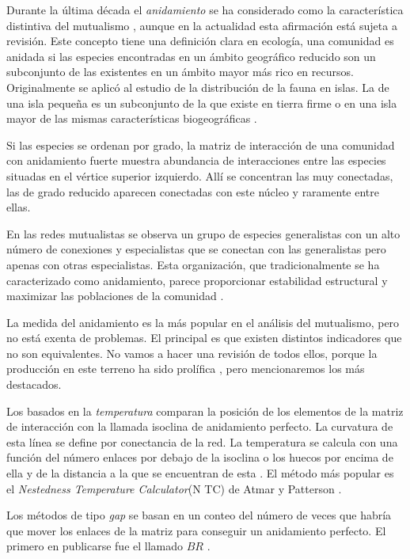 Durante la última década el \textit{anidamiento} se ha considerado como la característica distintiva del mutualismo \cite{bascompte2003nested}, aunque en la actualidad esta afirmación está sujeta a revisión. Este concepto tiene una definición clara en ecología, una comunidad es anidada si las especies encontradas en un ámbito geográfico reducido son un subconjunto de las existentes en un ámbito mayor más rico en recursos. Originalmente se aplicó al estudio de la distribución de la fauna en islas. La de una isla pequeña es un subconjunto de la que existe en tierra firme o en una isla mayor de las mismas características biogeográficas \cite{young1958zoogeography, atmar1986nested}.

Si las especies se ordenan por grado, la matriz de interacción de una comunidad con anidamiento fuerte muestra abundancia de interacciones entre las especies situadas en el vértice superior izquierdo. Allí se concentran las muy conectadas,
las de grado reducido aparecen conectadas con este núcleo y raramente entre ellas.

En las redes mutualistas se observa un grupo de especies generalistas con un alto número de conexiones y especialistas que se conectan con las generalistas pero apenas con otras especialistas. Esta organización, que tradicionalmente se ha caracterizado como anidamiento, parece proporcionar estabilidad estructural y maximizar las poblaciones de la comunidad \cite{memmott2004tolerance,bastolla2009,thebault2010stability,suweis2013emergence}. 

La medida del anidamiento es la más popular en el análisis del mutualismo, pero no está exenta de problemas. El principal es que existen distintos indicadores que no son equivalentes. No vamos a hacer una revisión de todos ellos, porque la producción en este terreno ha sido prolífica \cite{ulrich2009consumer}, pero mencionaremos los más destacados. 

Los basados en la \textit{temperatura} comparan la posición de los elementos de la matriz de interacción con la llamada isoclina de anidamiento perfecto. La curvatura de esta línea se define por conectancia de la red. La temperatura se calcula con una función del número enlaces por debajo de la isoclina o los huecos por encima de ella y de la distancia a la que se encuentran de esta \cite{ulrich2007null}. El método más popular es el \textit{Nestedness Temperature Calculator}(N TC) de Atmar y Patterson \cite{atmar1995nestedness}.

Los métodos de tipo \textit{gap} se basan en un conteo del número de veces que habría que mover los enlaces de la matriz para conseguir un anidamiento perfecto. El primero en publicarse fue el llamado $BR$ \cite{brualdi1999nested}.

